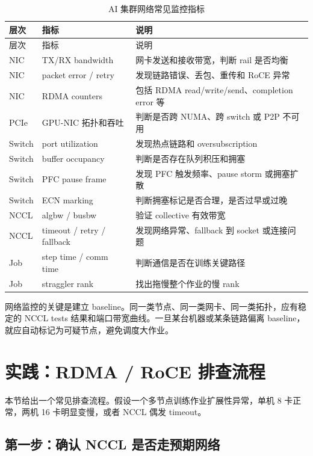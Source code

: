 \begin{longtable}{p{3.2cm}p{5.0cm}p{5.2cm}}
  \caption{AI 集群网络常见监控指标}
  \label{tab:ai-network-monitoring} \\
  \toprule
  层次 & 指标 & 说明 \\
  \midrule
  \endfirsthead
  \toprule
  层次 & 指标 & 说明 \\
  \midrule
  \endhead
  NIC & TX/RX bandwidth & 网卡发送和接收带宽，判断 rail 是否均衡 \\
  NIC & packet error / retry & 发现链路错误、丢包、重传和 RoCE 异常 \\
  NIC & RDMA counters & 包括 RDMA read/write/send、completion error 等 \\
  PCIe & GPU-NIC 拓扑和吞吐 & 判断是否跨 NUMA、跨 switch 或 P2P 不可用 \\
  Switch & port utilization & 发现热点链路和 oversubscription \\
  Switch & buffer occupancy & 判断是否存在队列积压和拥塞 \\
  Switch & PFC pause frame & 发现 PFC 触发频率、pause storm 或拥塞扩散 \\
  Switch & ECN marking & 判断拥塞标记是否合理，是否过早或过晚 \\
  NCCL & algbw / busbw & 验证 collective 有效带宽 \\
  NCCL & timeout / retry / fallback & 发现网络异常、fallback 到 socket 或连接问题 \\
  Job & step time / comm time & 判断通信是否在训练关键路径 \\
  Job & straggler rank & 找出拖慢整个作业的慢 rank \\
  \bottomrule
\end{longtable}

网络监控的关键是建立 baseline。同一类节点、同一类网卡、同一类拓扑，应有稳定的 NCCL tests 结果和端口带宽曲线。一旦某台机器或某条链路偏离 baseline，就应自动标记为可疑节点，避免调度大作业。

\section{实践：RDMA / RoCE 排查流程}
\label{sec:rdma-roce-debug-workflow}

本节给出一个常见排查流程。假设一个多节点训练作业扩展性异常，单机 8 卡正常，两机 16 卡明显变慢，或者 NCCL 偶发 timeout。

\subsection{第一步：确认 NCCL 是否走预期网络}
\label{subsec:debug-nccl-network}


